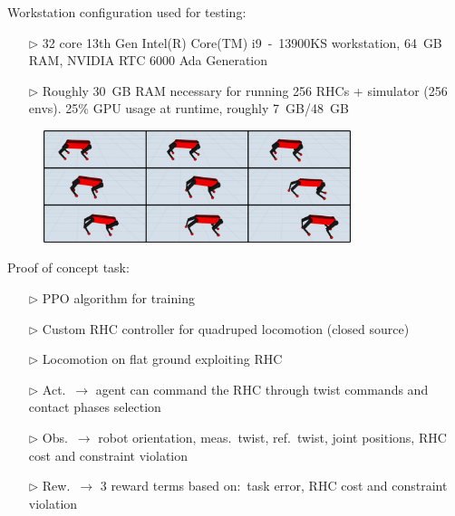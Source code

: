 \begin{Large}
\vskip1cm
\hskip0.5cm Workstation configuration used for testing:\vskip0.3cm
\begin{itemize}
	\item[$\rhd$] 32 core 13th Gen Intel(R) Core(TM) i9~-~13900KS workstation, 64~GB RAM, NVIDIA RTC 6000 Ada Generation\vskip0.3cm
	\item[$\rhd$] Roughly 30~GB RAM necessary for running 256 RHCs + simulator (256 envs). 25\% GPU usage at runtime, roughly 7~GB/48~GB \vskip0.3cm
\end{itemize}\vskip0.5cm
\begin{figure}[h]
	\includegraphics[width=0.8\textwidth]{docs/imgs/proof_of_concept.pdf}
\end{figure}\vskip0.3cm
\hskip0.5cm Proof of concept task:\vskip0.3cm
\begin{itemize}
	\item[$\rhd$] PPO algorithm for training
	\item[$\rhd$] Custom RHC controller for quadruped locomotion (closed source)
	\item[$\rhd$] Locomotion on flat ground exploiting RHC
	\item[$\rhd$] Act.~$\rightarrow$ agent can command the RHC through twist commands and contact phases selection
	\item[$\rhd$] Obs.~$\rightarrow$ robot orientation, meas.~twist, ref.~twist, joint positions, RHC cost and constraint violation
	\item[$\rhd$] Rew.~$\rightarrow$ 3 reward terms based on:~task error, RHC cost and constraint violation
\end{itemize}\vskip0.5cm
\end{Large}

	